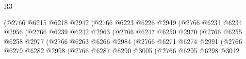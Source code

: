 \begin{lexlean}{R3}
\begin{coremodule}
                                          (@2766
                                            @6215
                                            @6218
                                            @2942
                                            (@2766
                                              @6223
                                              @6226
                                              @2949
                                              (@2766
                                                @6231
                                                @6234
                                                @2956
                                                (@2766
                                                  @6239
                                                  @6242
                                                  @2963
                                                  (@2766
                                                    @6247
                                                    @6250
                                                    @2970
                                                    (@2766
                                                      @6255
                                                      @6258
                                                      @2977
                                                      (@2766
                                                        @6263
                                                        @6266
                                                        @2984
                                                        (@2766
                                                          @6271
                                                          @6274
                                                          @2991
                                                          (@2766
                                                            @6279
                                                            @6282
                                                            @2998
                                                            (@2766
                                                              @6287
                                                              @6290
                                                              @3005
                                                              (@2766
                                                                @6295
                                                                @6298
                                                                @3012

\end{coremodule}
\end{lexlean}
